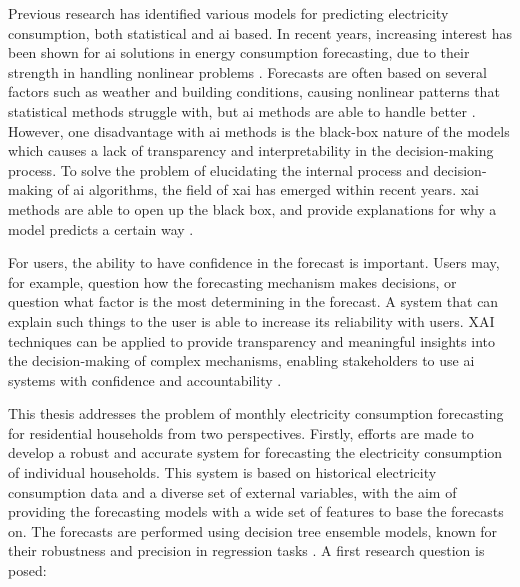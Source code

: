 Previous research has identified various models for predicting electricity consumption, both statistical and \ac{ai} based. In recent years, increasing interest has been shown for \ac{ai} solutions in energy consumption forecasting, due to their strength in handling nonlinear problems \cite{mat_daut_building_2017,deb_review_2017}. Forecasts are often based on several factors such as weather and building conditions, causing nonlinear patterns that statistical methods struggle with, but \ac{ai} methods are able to handle better \cite{mat_daut_building_2017}. However, one disadvantage with \ac{ai} methods is the black-box nature of the models which causes a lack of transparency and interpretability in the decision-making process. To solve the problem of elucidating the internal process and decision-making of \ac{ai} algorithms, the field of \ac{xai} has emerged within recent years. \ac{xai} methods are able to open up the black box, and provide explanations for why a model predicts a certain way \cite{minh_explainable_2022}.

For users, the ability to have confidence in the forecast is important. Users may, for example, question how the forecasting mechanism makes decisions, or question what factor is the most determining in the forecast. A system that can explain such things to the user is able to increase its reliability with users. XAI techniques can be applied to provide transparency and meaningful insights into the decision-making of complex mechanisms, enabling stakeholders to use \ac{ai} systems with confidence and accountability \cite{twala_clustering_2025}. %


This thesis addresses the problem of monthly electricity consumption forecasting for residential households from two perspectives. Firstly, efforts are made to develop a robust and accurate system for forecasting the electricity consumption of individual households. This system is based on historical electricity consumption data and a diverse set of external variables, with the aim of providing the forecasting models with a wide set of features to base the forecasts on. The forecasts are performed using decision tree ensemble models, known for their robustness and precision in regression tasks \cite{moon_advancing_2024}. A first research question is posed:

